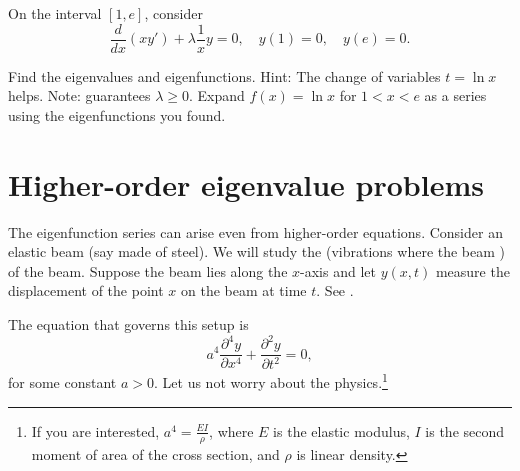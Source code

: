 \begin{exercise}[challenging]
On the interval $[1,e]$, consider
\begin{equation*}
\frac{d}{dx} (x y') + \lambda \frac{1}{x} y = 0, \quad y(1) = 0,
\quad y(e) = 0 .
\end{equation*}
\begin{tasks}
\task
Find the eigenvalues and eigenfunctions.
Hint: The change of variables $t = \ln x$ helps.
Note:  guarantees $\lambda \geq 0$.
\task
Expand $f(x) = \ln x$ for $1 < x < e$
as a series using
the eigenfunctions you found.
\end{tasks}
\end{exercise}


\sectionnewpage
\section{Higher-order eigenvalue problems}
\label{sec:appeig}


The eigenfunction series can arise even from higher-order equations.
Consider an elastic beam (say made of steel).  We will study the
\emph{}
(vibrations where the beam )
of the beam.
Suppose the beam lies along
the $x$-axis and let $y(x,t)$ measure the displacement of the point $x$
on the beam at time $t$.  See .

\begin{myfig}
\capstart
{}
\caption{Transversal vibrations of a beam.\label{appeig:transbeamfig}}
\end{myfig}

The equation that governs this setup is
\begin{equation*}
a^4 \frac{\partial^4 y}{\partial x^4} + \frac{\partial^2 y}{\partial t^2} = 0,
\end{equation*}
for some constant $a > 0$.
Let us not worry about the physics.\footnote{If
you are interested, $a^4 = \frac{EI}{\rho}$, where $E$ is the elastic
modulus, $I$ is the second moment of area of the cross section,
and $\rho$ is linear density.}

